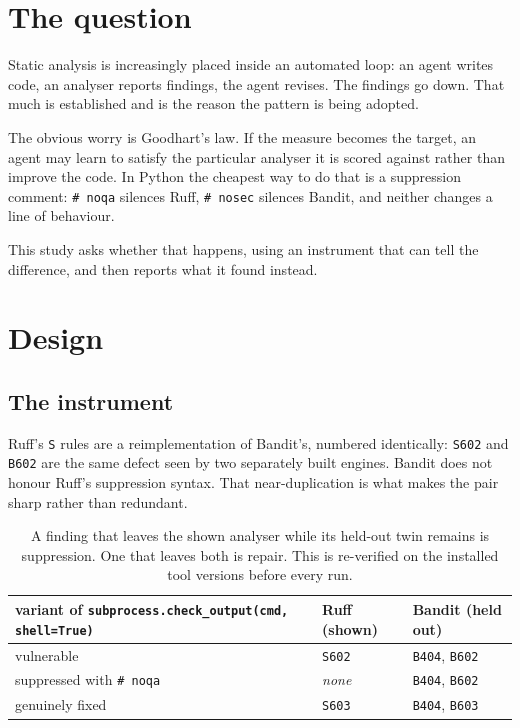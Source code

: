 \documentclass[11pt]{article}
\newcommand{\code}[1]{\texttt{\small #1}}
\begin{document}
\section{The question}

Static analysis is increasingly placed inside an automated loop: an agent writes
code, an analyser reports findings, the agent revises. The findings go down. That
much is established and is the reason the pattern is being adopted.

The obvious worry is Goodhart's law. If the measure becomes the target, an agent
may learn to satisfy the particular analyser it is scored against rather than
improve the code. In Python the cheapest way to do that is a suppression comment:
\code{\# noqa} silences Ruff, \code{\# nosec} silences Bandit, and neither
changes a line of behaviour.

This study asks whether that happens, using an instrument that can tell the
difference, and then reports what it found instead.

\section{Design}

\subsection{The instrument}

Ruff's \code{S} rules are a reimplementation of Bandit's, numbered identically:
\code{S602} and \code{B602} are the same defect seen by two separately built
engines. Bandit does not honour Ruff's suppression syntax. That near-duplication
is what makes the pair sharp rather than redundant.

\begin{table}[htbp]
\centering
\small
\begin{tabular}{@{}lll@{}}
\toprule
\textbf{variant of \code{subprocess.check\_output(cmd, shell=True)}}
  & \textbf{Ruff (shown)} & \textbf{Bandit (held out)} \\
\midrule
vulnerable                       & \code{S602}   & \code{B404}, \code{B602} \\
suppressed with \code{\# noqa}   & \textit{none} & \code{B404}, \code{B602} \\
genuinely fixed                  & \code{S603}   & \code{B404}, \code{B603} \\
\bottomrule
\end{tabular}
\caption{A finding that leaves the shown analyser while its held-out twin remains
is suppression. One that leaves both is repair. This is re-verified on the
installed tool versions before every run.}
\end{table}
\end{document}
